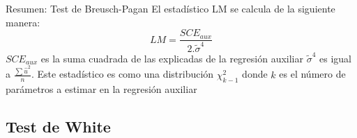\begin{frame}{Resumen: Test de Breusch-Pagan}
	El estadístico LM se calcula de la siguiente manera:
		$$LM = \frac{SCE_{aux}}{2.\tilde{\sigma}^{4}}$$
	$SCE_{aux}$ es la suma cuadrada de las explicadas de la regresión auxiliar $\tilde{\sigma}^{4}$ es igual a $\frac{\sum \hat{u}^2}{n}$. Este estadístico es como una distribución $\chi_{k-1}^{2}$ donde $k$ es el número de parámetros a estimar en la regresión auxiliar 
\end{frame}

\subsection{Test de White}

